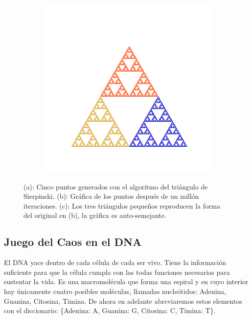 \documentclass[letterpaper,12pt,oneside]{book}
\begin{document}
\begin{figure}[h]
\begin{subfigure}{.3\textwidth}
  \caption{}
  \label{fig:Sier_sub2}
\end{subfigure}%
\begin{subfigure}{.3\textwidth}
  \centering
  \includegraphics[width=1\linewidth]{Ilustraciones/Cap_SFI/Sierpinski_Fractal_Highlight.png}
  \caption{}
  \label{fig:Sier_sub3}
\end{subfigure}
\caption{(a): Cinco puntos generados con el algoritmo del triángulo de Sierpinski. (b): Gráfica de los puntos después de un millón iteraciones. (c): Los tres triángulos pequeños reproducen la forma del original en (b), la gráfica es auto-semejante.}
\label{fig:Sierpinski}
\end{figure}


\subsection*{Juego del Caos en el DNA}

El DNA yace dentro de cada célula de cada ser vivo. Tiene la información suficiente para que la célula cumpla con las todas funciones necesarias para sustentar la vida. Es una macromolécula que forma una espiral y en cuyo interior hay únicamente cuatro posibles moléculas, llamadas nucleótidos: Adenina, Guanina, Citosina, Timina. De ahora en adelante abreviaremos estos elementos con el diccionario: \{Adenina: A, Guanina: G, Citosina: C, Timina: T\}.
\end{document}
